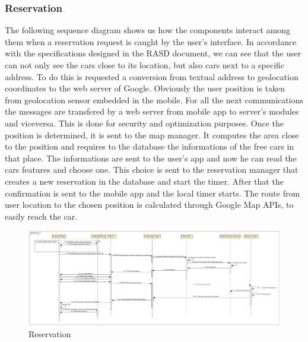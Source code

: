 \documentclass[english]{article}
\begin{document}
		\subsubsection{Reservation}
		The following sequence diagram shows us how the components interact among them when a reservation request is caught by the user's interface.
		In accordance with the specifications designed in the RASD document, we can see that the user can not only see the cars close to its location, but also cars next to a specific address. To do this is requested a conversion from textual address to geolocation coordinates to the web server of Google. Obviously the user position is taken from geolocation sensor embedded in the mobile.
		For all the next communications the messages are transfered by a web server from mobile app to server's modules and viceversa. This is done for security and optimization purposes.
		Once the position is determined, it is sent to the map manager. It computes the area close to the position and requires to the database the informations of the free cars in that place.
		The informations are sent to the user's app and now he can read the cars features and choose one.
		This choice is sent to the reservation manager that creates a new reservation in the database and start the timer.
		After that the confirmation is sent to the mobile app and the local timer starts.
		The route from user location to the chosen position is calculated through Google Map APIs, to easily reach the car. 
	\begin{landscape}
		\begin{figure}[H]
				\centering
				\includegraphics[scale=0.174]{./SequenceDiagrams/Reservation/Reservation.pdf}%
				\caption{Reservation}
		\end{figure}
	\end{landscape}
\end{document}
